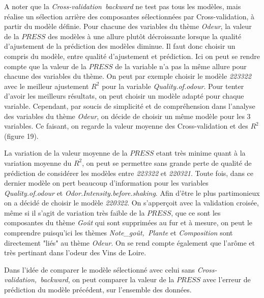 \documentclass[a4paper,french,10pt]{article}
\begin{document}
A noter que la \textit{Cross-validation~backward} ne test pas tous les modèles, mais réalise un sélection arrière des composantes sélectionnées par Cross-validation, à partir du modèle définie. \newline
Pour chacune des variables du thème \textit{Odeur}, la valeur de la $PRESS$ des modèles à une allure plutôt décroissante lorsque la qualité d'ajustement de la prédiction des modèles diminue. Il faut donc choisir un compris du modèle, entre qualité d'ajustement et prédiction. \newline
Ici on peut se rendre compte que la valeur de la $PRESS$ de la variable n'a pas la même allure pour chacune des variables du thème. On peut par exemple choisir le modèle \textit{223322} avec le meilleur ajustement $R^2$ pour la variable \textit{Quality.of.odour}.\newline
Pour tenter d'avoir les meilleurs résultats, on peut choisir un modèle adapté pour chaque variable. Cependant, par soucis de simplicité et de compréhension dans l'analyse des variables du thème \textit{Odeur}, on décide de choisir un même modèle pour les 3 variables. Ce faisant, on regarde la valeur moyenne des Cross-validation et des $R^2$ (figure 19).\newline

La variation de la valeur moyenne de la $PRESS$ etant très minime quant à la variation moyenne du $R^2$, on peut se permettre sans grande perte de qualité de prédiction de considérer les modèles entre \textit{223322} et \textit{220321}. Toute fois, dans ce dernier modèle on pert beaucoup d'information pour les variables \textit{Quality.of.odour} et \textit{Odor.Intensity.before.shaking}. Afin d'être le plus partimonieux on a décidé de choisir le modèle \textit{220322}. \newline
On s'apperçoit avec la validation croisée, même si il s'agit de variation très faible de la $PRESS$, que ce sont les composantes du thème \textit{Goût} qui sont supprimées au fur et à mesure, on peut le comprendre puisqu'ici les thèmes \textit{Note\_goût,~Plante} et \textit{Composition} sont directement "liés" au thème \textit{Odeur}. On se rend compte également que l'arôme et très pertinant dans l'odeur des Vins de Loire. \newline

Dans l'idée de comparer le modèle sélectionné avec celui sans \textit{Cross-validation,~backward}, on peut comparer la valeur de la $PRESS$ avec l'erreur de prédiction du modèle précédent, sur l'ensemble des données. \newline
\end{document}
